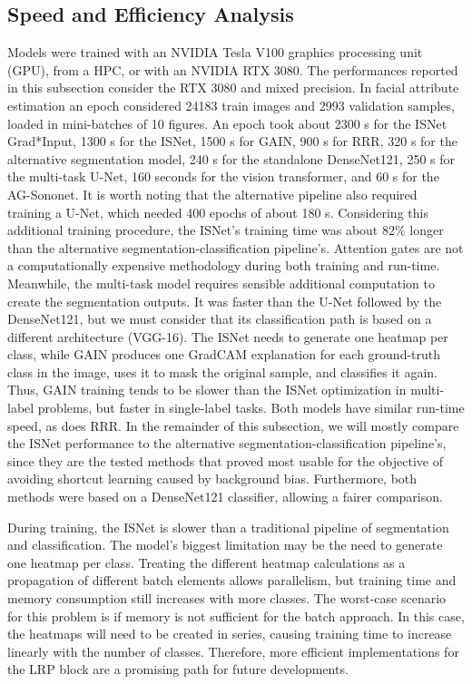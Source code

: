 \documentclass[fleqn,10pt]{wlscirep}
\begin{document}
{\subsection{Speed and Efficiency Analysis}
\label{speed}

Models were trained with an NVIDIA Tesla V100 graphics processing unit (GPU), from a HPC, or with an NVIDIA RTX 3080. The performances reported in this subsection consider the RTX 3080 and mixed precision. In facial attribute estimation an epoch considered 24183 train images and 2993 validation samples, loaded in mini-batches of 10 figures. An epoch took about 2300 s for the ISNet Grad*Input, 1300 s for the ISNet, 1500 s for GAIN, 900 s for RRR, 320 s for the alternative segmentation model, 240 s for the standalone DenseNet121, 250 s for the multi-task U-Net, 160 seconds for the vision transformer, and 60 s for the AG-Sononet. It is worth noting that the alternative pipeline also required training a U-Net, which needed 400 epochs of about 180 s. Considering this additional training procedure, the ISNet's training time was about 82\% longer than the alternative segmentation-classification pipeline's. Attention gates are not a computationally expensive methodology during both training and run-time. Meanwhile, the multi-task model requires sensible additional computation to create the segmentation outputs. It was faster than the U-Net followed by the DenseNet121, but we must consider that its classification path is based on a different architecture (VGG-16). The ISNet needs to generate one heatmap per class, while GAIN produces one GradCAM explanation for each ground-truth class in the image, uses it to mask the original sample, and classifies it again. Thus, GAIN training tends to be slower than the ISNet optimization in multi-label problems, but faster in single-label tasks. Both models have similar run-time speed, as does RRR. In the remainder of this subsection, we will mostly compare the ISNet performance to the alternative segmentation-classification pipeline's, since they are the tested methods that proved most usable for the objective of avoiding shortcut learning caused by background bias. Furthermore, both methods were based on a DenseNet121 classifier, allowing a fairer comparison.

During training, the ISNet is slower than a traditional pipeline of segmentation and classification. The model's biggest limitation may be the need to generate one heatmap per class. Treating the different heatmap calculations as a propagation of different batch elements allows parallelism, but training time and memory consumption still increases with more classes. The worst-case scenario for this problem is if memory is not sufficient for the batch approach. In this case, the heatmaps will need to be created in series, causing training time to increase linearly with the number of classes. Therefore, more efficient implementations for the LRP block are a promising path for future developments.

}
\end{document}
